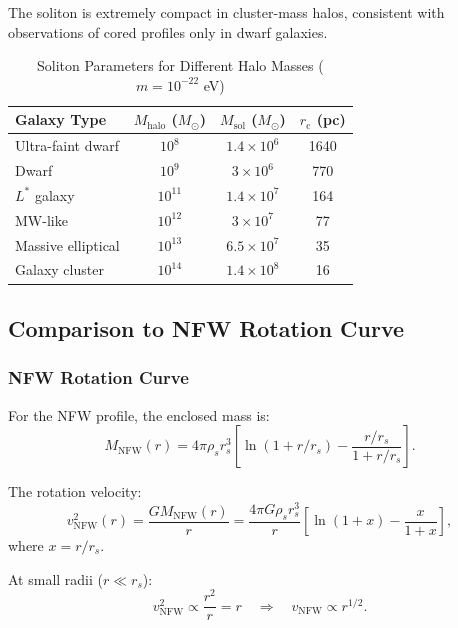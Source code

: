 \documentclass[11pt,a4paper]{article}
\newcommand{\Msun}{\ensuremath{M_{\odot}}}
\newcommand{\Msol}{\ensuremath{M_{\mathrm{sol}}}}
\newcommand{\Mhalo}{\ensuremath{M_{\mathrm{halo}}}}
\newcommand{\rc}{\ensuremath{r_{\mathrm{c}}}}
\theoremstyle{definition}
\theoremstyle{remark}
\begin{document}
The soliton is extremely compact in cluster-mass halos, consistent with observations of cored profiles only in dwarf galaxies.

\begin{table}[H]
\centering
\caption{Soliton Parameters for Different Halo Masses ($m = 10^{-22}$ eV)}
\begin{tabular}{@{}lccc@{}}
\toprule
\textbf{Galaxy Type} & $\Mhalo$ ($\Msun$) & $\Msol$ ($\Msun$) & $\rc$ (pc) \\
\midrule
Ultra-faint dwarf & $10^8$ & $1.4 \times 10^6$ & 1640 \\
Dwarf & $10^9$ & $3 \times 10^6$ & 770 \\
$L^*$ galaxy & $10^{11}$ & $1.4 \times 10^7$ & 164 \\
MW-like & $10^{12}$ & $3 \times 10^7$ & 77 \\
Massive elliptical & $10^{13}$ & $6.5 \times 10^7$ & 35 \\
Galaxy cluster & $10^{14}$ & $1.4 \times 10^8$ & 16 \\
\bottomrule
\end{tabular}
\end{table}

\subsection{Comparison to NFW Rotation Curve}
\label{sec:NFW_comparison}

\subsubsection{NFW Rotation Curve}

For the NFW profile, the enclosed mass is:
\begin{equation}
M_{\mathrm{NFW}}(r) = 4\pi \rho_s r_s^3 \left[\ln(1 + r/r_s) - \frac{r/r_s}{1 + r/r_s}\right].
\end{equation}

The rotation velocity:
\begin{equation}
v_{\mathrm{NFW}}^2(r) = \frac{G M_{\mathrm{NFW}}(r)}{r} = \frac{4\pi G \rho_s r_s^3}{r}\left[\ln(1 + x) - \frac{x}{1+x}\right],
\end{equation}
where $x = r/r_s$.

At small radii ($r \ll r_s$):
\begin{equation}
v_{\mathrm{NFW}}^2 \propto \frac{r^2}{r} = r \quad \Rightarrow \quad v_{\mathrm{NFW}} \propto r^{1/2}.
\end{equation}
\end{document}
